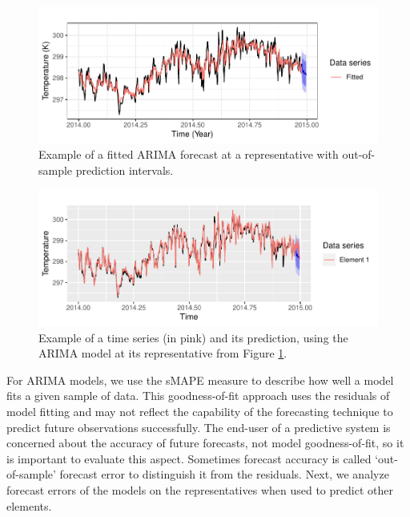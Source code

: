 \begin{figure}[h!]
	\centering
	\includegraphics[scale=1]{../Figures/medoid_forecast_fitted}
	\caption{Example of a fitted ARIMA forecast at a representative with out-of-sample prediction intervals.}
	\label{Fig:ModelFinalToForecast}
\end{figure}

\begin{figure}[h!]
	\centering
	\includegraphics[scale=1]{../Figures/forecast_element1}
	\caption{Example of a time series (in pink) and its prediction, using the ARIMA model at its representative from Figure \ref{Fig:ModelFinalToForecast}.}
	\label{Fig:ForecastElement1}
\end{figure}

For ARIMA models, we use the sMAPE measure to describe how well a model fits a given sample of data. This goodness-of-fit approach uses the residuals of model fitting and may not reflect the capability of the forecasting technique to predict future observations \cite{Montgomery2015} successfully. The end-user of a predictive system is concerned about the accuracy of future forecasts, not model goodness-of-fit, so it is important to evaluate this aspect. Sometimes forecast accuracy is called `out-of-sample' forecast error to distinguish it from the residuals. Next, we analyze forecast errors of the models on the representatives when used to predict other elements.

